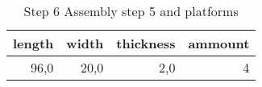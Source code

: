 \begin{table}[h!]
\centering
\caption{Step 6 Assembly step 5 and platforms}
\begin{tabular}{rrrr}
\toprule
 length &  width &  thickness &  ammount \\
\midrule
   96,0 &   20,0 &        2,0 &        4 \\
\bottomrule
\end{tabular}
\end{table}
